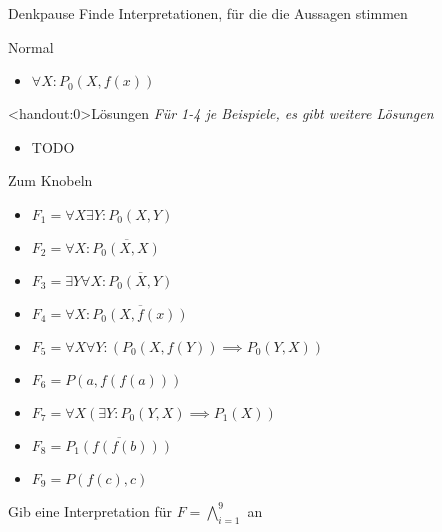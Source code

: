 {
\begin{frame}{Denkpause}
	Finde Interpretationen, für die die Aussagen stimmen
	\begin{block}{Normal}
		\begin{itemize}
			\item $\forall X: {P_0(X,f(x))}$
		\end{itemize}
	\end{block}
\end{frame}

\begin{frame}<handout:0>{Lösungen}
	\textit{Für 1-4 je Beispiele, es gibt weitere Lösungen}
	\begin{itemize}[<+- | alert@+>]
		\item TODO
	\end{itemize}

\end{frame}

\begin{frame}{Zum Knobeln}
	\small
	\begin{block}{}
		\begin{multicols}{2}
			\begin{itemize}
				\item $F_1 = \forall X \exists Y: P_0(X,Y)$
				\item $F_2 = \forall X: \overline{P_0(X,X)}$
				\item $F_3 = \exists Y \forall X: \overline{P_0(X,Y)}$
				\item $F_4 = \forall X: \overline{P_0(X,f(x))}$
				\item {\scriptsize$F_5 = \forall X \forall Y: (P_0(X,f(Y)) \implies P_0(Y,X))$}
				\item $F_6 = P(a, f(f(a)))$
				\item $F_7 = \forall X (\exists Y: P_0(Y,X)\implies P_1(X))$
				\item $F_8 = \overline{P_1(f(f(b)))}$
				\item $F_9 = P(f(c),c)$
			\end{itemize}
		\end{multicols}
		Gib eine Interpretation für $F = \bigwedge_{i=1}^9$ an
	\end{block}
\end{frame}
}